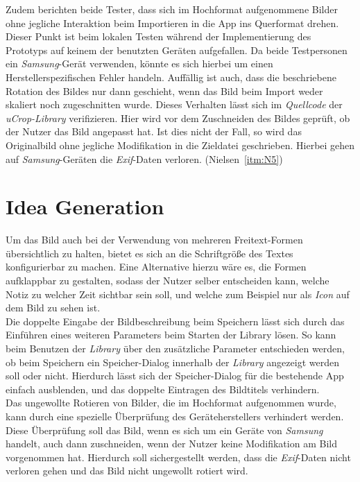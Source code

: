 Zudem berichten beide Tester, dass sich im Hochformat aufgenommene Bilder ohne jegliche Interaktion beim Importieren in die App ins Querformat drehen.
Dieser Punkt ist beim lokalen Testen während der Implementierung des Prototyps auf keinem der benutzten Geräten aufgefallen.
Da beide Testpersonen ein \emph{Samsung}-Gerät verwenden, könnte es sich hierbei um einen Herstellerspezifischen Fehler handeln.
Auffällig ist auch, dass die beschriebene Rotation des Bildes nur dann geschieht, wenn das Bild beim Import weder skaliert noch zugeschnitten wurde.
Dieses Verhalten lässt sich im \emph{Quellcode} der \emph{uCrop-Library} verifizieren.
Hier wird vor dem Zuschneiden des Bildes geprüft, ob der Nutzer das Bild angepasst hat.
Ist dies nicht der Fall, so wird das Originalbild ohne jegliche Modifikation in die Zieldatei geschrieben.
Hierbei gehen auf \emph{Samsung}-Geräten die \emph{Exif}-Daten verloren.
(Nielsen~\autoref{itm:N5}) \\ 

\section{Idea Generation}\label{sec:idea4}
Um das Bild auch bei der Verwendung von mehreren Freitext-Formen übersichtlich zu halten, bietet es sich an die Schriftgröße des Textes konfigurierbar zu machen.
Eine Alternative hierzu wäre es, die Formen aufklappbar zu gestalten, sodass der Nutzer selber entscheiden kann, welche Notiz zu welcher Zeit sichtbar sein soll, und welche zum Beispiel nur als \emph{Icon} auf dem Bild zu sehen ist. \\

Die doppelte Eingabe der Bildbeschreibung beim Speichern lässt sich durch das Einführen eines weiteren Parameters beim Starten der Library lösen.
So kann beim Benutzen der \emph{Library} über den zusätzliche Parameter entschieden werden, ob beim Speichern ein Speicher-Dialog innerhalb der \emph{Library} angezeigt werden soll oder nicht.
Hierdurch lässt sich der Speicher-Dialog für die bestehende App einfach ausblenden, und das doppelte Eintragen des Bildtitels verhindern. \\

Das ungewollte Rotieren von Bilder, die im Hochformat aufgenommen wurde, kann durch eine spezielle Überprüfung des Geräteherstellers verhindert werden.
Diese Überprüfung soll das Bild, wenn es sich um ein Geräte von \emph{Samsung} handelt, auch dann zuschneiden, wenn der Nutzer keine Modifikation am Bild vorgenommen hat.
Hierdurch soll sichergestellt werden, dass die \emph{Exif}-Daten nicht verloren gehen und das Bild nicht ungewollt rotiert wird.

